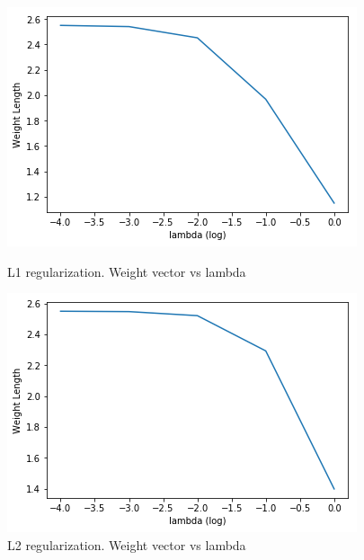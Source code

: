 \documentclass{article}
\begin{document}
\begin{figure}[h]
	\begin{minipage}{0.48\textwidth}
		\centering
		\includegraphics[width=\textwidth]{pics/weight_1.png}
		\caption{L1 regularization. Weight vector vs lambda}
	\end{minipage}\hfill
	\begin {minipage}{0.48\textwidth}
	\centering
		\includegraphics[width=\textwidth]{pics/weight_2.png}
		\caption{L2 regularization.  Weight vector vs lambda}
\end{minipage}
\end{figure}
\end{document}
